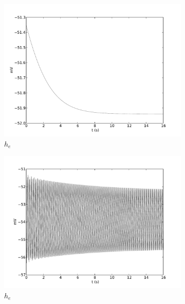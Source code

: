 \documentclass[a4paper,12pt]{article}
\begin{document}
\begin{figure}
	\begin{subfigure}[b]{0.5\textwidth}
		\includegraphics[scale=0.35]{frontiers-2012-images-revised/effect_gamma_ee_yml-00143_ode-burst-thal-rev_yml-thal-rev-mod-1_2-0_5-1-save_yml-he-thal.pdf}
		\caption{$h_e$}
	\end{subfigure}
	\begin{subfigure}[b]{0.5\textwidth}
		\includegraphics[scale=0.35]{frontiers-2012-images-revised/effect_gamma_ee_yml-00143_ode-burst-thal-rev_yml-thal-rev-mod-1-0_5-1-save_yml-he-thal.pdf}
		\caption{$h_e$}
	\end{subfigure}
	\begin{subfigure}[b]{0.5\textwidth}

\end{subfigure}
\end{figure}
\end{document}
